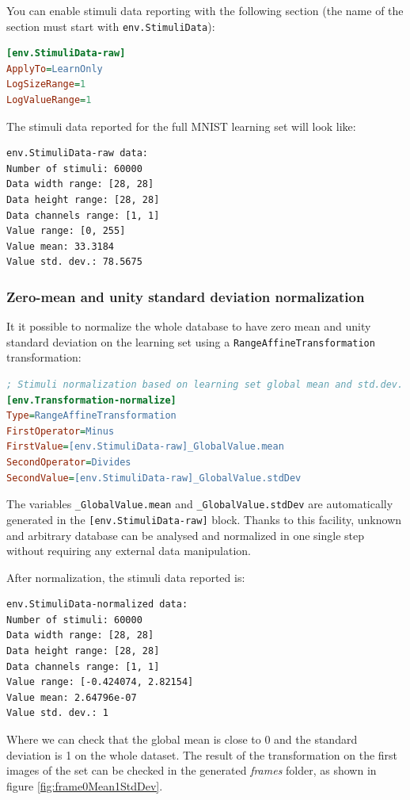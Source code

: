 \documentclass[a4paper,11pt,oneside]{article}
\begin{document}
You can enable stimuli data reporting with the following section (the name of
the section must start with \lstinline!env.StimuliData!):
\begin{lstlisting}[language=ini]
[env.StimuliData-raw]
ApplyTo=LearnOnly
LogSizeRange=1
LogValueRange=1
\end{lstlisting}

The stimuli data reported for the full MNIST learning set will look like:
\begin{lstlisting}[style=console]
env.StimuliData-raw data:
Number of stimuli: 60000
Data width range: [28, 28]
Data height range: [28, 28]
Data channels range: [1, 1]
Value range: [0, 255]
Value mean: 33.3184
Value std. dev.: 78.5675
\end{lstlisting}

\subsubsection{Zero-mean and unity standard deviation normalization}

It it possible to normalize the whole database to have zero mean and unity
standard deviation on the learning set using a
\lstinline!RangeAffineTransformation! transformation:
\begin{lstlisting}[language=ini]
; Stimuli normalization based on learning set global mean and std.dev.
[env.Transformation-normalize]
Type=RangeAffineTransformation
FirstOperator=Minus
FirstValue=[env.StimuliData-raw]_GlobalValue.mean
SecondOperator=Divides
SecondValue=[env.StimuliData-raw]_GlobalValue.stdDev
\end{lstlisting}
The variables \lstinline!_GlobalValue.mean! and \lstinline!_GlobalValue.stdDev!
are automatically generated in the \lstinline![env.StimuliData-raw]! block.
Thanks to this facility, unknown and arbitrary database can be analysed and
normalized in one single step without requiring any external data manipulation.

After normalization, the stimuli data reported is:
\begin{lstlisting}[style=console]
env.StimuliData-normalized data:
Number of stimuli: 60000
Data width range: [28, 28]
Data height range: [28, 28]
Data channels range: [1, 1]
Value range: [-0.424074, 2.82154]
Value mean: 2.64796e-07
Value std. dev.: 1
\end{lstlisting}

Where we can check that the global mean is close to 0 and the standard deviation
 is 1 on the whole dataset. The result of the transformation on the first images
 of the set can be checked in the generated \emph{frames} folder, as shown in
 figure \ref{fig:frame0Mean1StdDev}.
\end{document}

